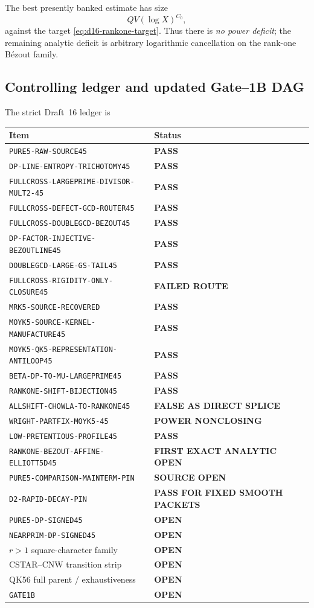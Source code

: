 \documentclass[11pt]{article}
\theoremstyle{definition}
\newcommand{\1}{\mathbf 1}
\begin{document}
The best presently banked estimate has size
\[
 QV(\log X)^{C_0},
\]
against the target \eqref{eq:d16-rankone-target}.  Thus there is
\emph{no power deficit}; the remaining analytic deficit is arbitrary
logarithmic cancellation on the rank-one B\'ezout family.

\subsection{Controlling ledger and updated Gate--1B DAG}
The strict Draft~16 ledger is
\begin{center}
\small
\begin{tabular}{p{}p{}}
\toprule
Item & Status\\
\midrule
\texttt{PURE5-RAW-SOURCE45} & \textbf{PASS}\\
\texttt{DP-LINE-ENTROPY-TRICHOTOMY45} & \textbf{PASS}\\
\texttt{FULLCROSS-LARGEPRIME-DIVISOR-MULT2-45} & \textbf{PASS}\\
\texttt{FULLCROSS-DEFECT-GCD-ROUTER45} & \textbf{PASS}\\
\texttt{FULLCROSS-DOUBLEGCD-BEZOUT45} & \textbf{PASS}\\
\texttt{DP-FACTOR-INJECTIVE-BEZOUTLINE45} & \textbf{PASS}\\
\texttt{DOUBLEGCD-LARGE-GS-TAIL45} & \textbf{PASS}\\
\texttt{FULLCROSS-RIGIDITY-ONLY-CLOSURE45} & \textbf{FAILED ROUTE}\\
\texttt{MRK5-SOURCE-RECOVERED} & \textbf{PASS}\\
\texttt{MOYK5-SOURCE-KERNEL-MANUFACTURE45} & \textbf{PASS}\\
\texttt{MOYK5-QK5-REPRESENTATION-ANTILOOP45} & \textbf{PASS}\\
\texttt{BETA-DP-TO-MU-LARGEPRIME45} & \textbf{PASS}\\
\texttt{RANKONE-SHIFT-BIJECTION45} & \textbf{PASS}\\
\texttt{ALLSHIFT-CHOWLA-TO-RANKONE45} & \textbf{FALSE AS DIRECT SPLICE}\\
\texttt{WRIGHT-PARTFIX-MOYK5-45} & \textbf{POWER NONCLOSING}\\
\texttt{LOW-PRETENTIOUS-PROFILE45} & \textbf{PASS}\\
\texttt{RANKONE-BEZOUT-AFFINE-ELLIOTT5D45} & \textbf{FIRST EXACT ANALYTIC OPEN}\\
\texttt{PURE5-COMPARISON-MAINTERM-PIN} & \textbf{SOURCE OPEN}\\
\texttt{D2-RAPID-DECAY-PIN} & \textbf{PASS FOR FIXED SMOOTH PACKETS}\\
\texttt{PURE5-DP-SIGNED45} & \textbf{OPEN}\\
\texttt{NEARPRIM-DP-SIGNED45} & \textbf{OPEN}\\
$r>1$ square-character family & \textbf{OPEN}\\
CSTAR--CNW transition strip & \textbf{OPEN}\\
QK56 full parent / exhaustiveness & \textbf{OPEN}\\
\texttt{GATE1B} & \textbf{OPEN}\\
\bottomrule
\end{tabular}
\end{center}
\end{document}
